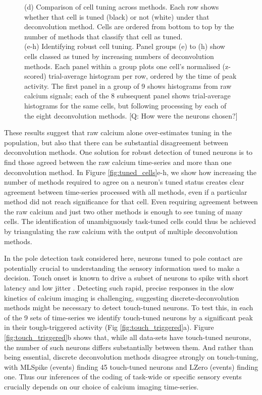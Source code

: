 \documentclass[a4paper,11pt]{article}
\begin{document}
\begin{figure}
{	(d) Comparison of cell tuning across methods. Each row shows whether that cell is tuned (black) or not (white) under that deconvolution method. Cells are ordered from bottom to top by the number of methods that classify that cell as tuned. \\
	(e-h) Identifying robust cell tuning. Panel groups (e) to (h) show cells classed as tuned by increasing numbers of deconvolution methods. Each panel within a group plots one cell's normalised (z-scored) trial-average histogram per row, ordered by the time of peak activity. The first panel in a group of 9 shows histograms from raw calcium signals; each of the 8 subsequent panel shows trial-average histograms for the same cells, but following processing by each of the eight deconvolution methods. [Q: How were the neurons chosen?]
}
\end{figure}

These results suggest that raw calcium alone over-estimates tuning in the population, but also that there can be substantial disagreement between deconvolution methods. One solution for robust detection of tuned neurons is to find those agreed between the raw calcium time-series and more than one deconvolution method. In Figure \ref{fig:tuned_cells}e-h, we show how increasing the number of methods required to agree on a neuron's tuned status creates clear agreement between time-series processed with all methods, even if a particular method did not reach significance for that cell. Even requiring agreement between the raw calcium and just two other methods is enough to see tuning of many cells. The identification of unambiguously task-tuned cells could thus be achieved by triangulating the raw calcium with the output of multiple deconvolution methods.

In the pole detection task considered here, neurons tuned to pole contact are potentially crucial to understanding the sensory information used to make a decision. Touch onset is known to drive a subset of neurons to spike with short latency and low jitter \citep{OConnor2010-hd, Hires2015-by}. Detecting such rapid, precise responses in the slow kinetics of calcium imaging is challenging, suggesting discrete-deconvolution methods might be necessary to detect touch-tuned neurons. To test this, in each of the 9 sets of time-series we identify touch-tuned neurons by a significant peak in their tough-triggered activity (Fig \ref{fig:touch_triggered}a). Figure \ref{fig:touch_triggered}b shows that, while all data-sets have touch-tuned neurons, the number of such neurons differs substantially between them. And rather than being essential, discrete deconvolution methods disagree strongly on touch-tuning, with MLSpike (events) finding 45 touch-tuned neurons and LZero (events) finding one. Thus our inferences of the coding of task-wide or specific sensory events crucially depends on our choice of calcium imaging time-series.
\end{document}
